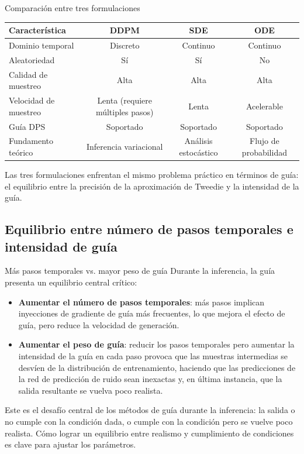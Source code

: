 \documentclass[a4paper]{article}
\begin{document}
\begin{knowledgebox}{Comparación entre tres formulaciones}
\begin{center}
\begin{tabular}{lccc}
\toprule
Característica & DDPM & SDE & ODE \\
\midrule
Dominio temporal & Discreto & Continuo & Continuo \\
Aleatoriedad & Sí & Sí & No \\
Calidad de muestreo & Alta & Alta & Alta \\
Velocidad de muestreo & Lenta (requiere múltiples pasos) & Lenta & Acelerable \\
Guía DPS & Soportado & Soportado & Soportado \\
Fundamento teórico & Inferencia variacional & Análisis estocástico & Flujo de probabilidad \\
\bottomrule
\end{tabular}
\end{center}
Las tres formulaciones enfrentan el mismo problema práctico en términos de guía: el equilibrio entre la precisión de la aproximación de Tweedie y la intensidad de la guía.
\end{knowledgebox}

\subsection{Equilibrio entre número de pasos temporales e intensidad de guía}

\begin{warningbox}{Más pasos temporales vs. mayor peso de guía}
Durante la inferencia, la guía presenta un equilibrio central crítico:
\begin{itemize}
    \item \textbf{Aumentar el número de pasos temporales}: más pasos implican inyecciones de gradiente de guía más frecuentes, lo que mejora el efecto de guía, pero reduce la velocidad de generación.
    \item \textbf{Aumentar el peso de guía}: reducir los pasos temporales pero aumentar la intensidad de la guía en cada paso provoca que las muestras intermedias se desvíen de la distribución de entrenamiento, haciendo que las predicciones de la red de predicción de ruido sean inexactas y, en última instancia, que la salida resultante se vuelva poco realista.
\end{itemize}
Este es el desafío central de los métodos de guía durante la inferencia: la salida o no cumple con la condición dada, o cumple con la condición pero se vuelve poco realista. Cómo lograr un equilibrio entre realismo y cumplimiento de condiciones es clave para ajustar los parámetros.
\end{warningbox}
\end{document}
